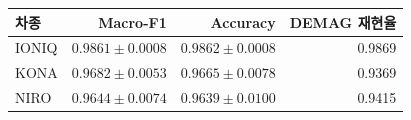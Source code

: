 \begin{tabular}{lrrr}
\toprule
차종 & Macro-F1 & Accuracy & DEMAG 재현율 \\
\midrule
IONIQ & $0.9861\pm0.0008$ & $0.9862\pm0.0008$ & 0.9869 \\
KONA & $0.9682\pm0.0053$ & $0.9665\pm0.0078$ & 0.9369 \\
NIRO & $0.9644\pm0.0074$ & $0.9639\pm0.0100$ & 0.9415 \\
\bottomrule
\end{tabular}
